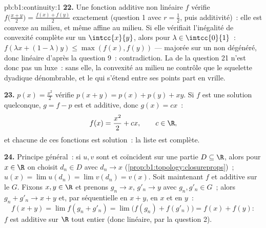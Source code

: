 \begin{solution}{pb:b1:continuity:1}
\textbf{22.} Une fonction additive non linéaire $f$ vérifie
$f\bigl(\frac{x+y}{2}\bigr) = \frac{f(x) + f(y)}{2}$ exactement
(question 1 avec $r = \frac12$, puis additivité)~: elle est convexe au
milieu, et même affine au milieu. Si elle vérifiait l'inégalité de
convexité complète sur un  $\intcc{x}{y}$, alors pour
$\lambda \in \intcc{0}{1}$~: $f(\lambda x + (1-\lambda)y) \leq
\max(f(x), f(y))$ --- majorée sur un  non dégénéré,
donc linéaire d'après la question 9~: contradiction. La  de
la question 21 n'est donc pas un luxe~: sans elle, la convexité au
milieu ne contrôle que le squelette dyadique dénombrable, et le
 qui s'étend entre ses points part en vrille.

\textbf{23.} $p(x) = \frac{x^2}{2}$ vérifie $p(x+y) = p(x) +
p(y) + xy$. Si $f$ est une solution  quelconque, $g = f - p$
est  et additive, donc $g(x) = cx$~:
\[
f(x) = \frac{x^2}{2} + cx , \qquad c \in \R ,
\]
et chacune de ces fonctions est solution~: la liste est complète.

\textbf{24.} Principe général~: si $u, v$ sont  et
coïncident sur une partie  $D \subseteq \R$, alors pour $x \in \R$
on choisit $d_n \in D$ avec $d_n \to x$
(\cref{prop:b1:topology:closureprops})~; $u(x) = \lim u(d_n) =
\lim v(d_n) = v(x)$. Soit maintenant $f$  et additive sur
le   $G$. Fixons $x, y \in \R$ et prenons $g_n \to x$,
$g'_n \to y$ avec $g_n, g'_n \in G$~; alors $g_n + g'_n \to x + y$
et, par  séquentielle en $x + y$, en $x$ et en $y$~:
\[
f(x + y) = \lim f(g_n + g'_n) = \lim\bigl(f(g_n) +
f(g'_n)\bigr) = f(x) + f(y) :
\]
$f$ est additive sur $\R$ tout entier (donc linéaire, par la question
2).


\end{solution}
